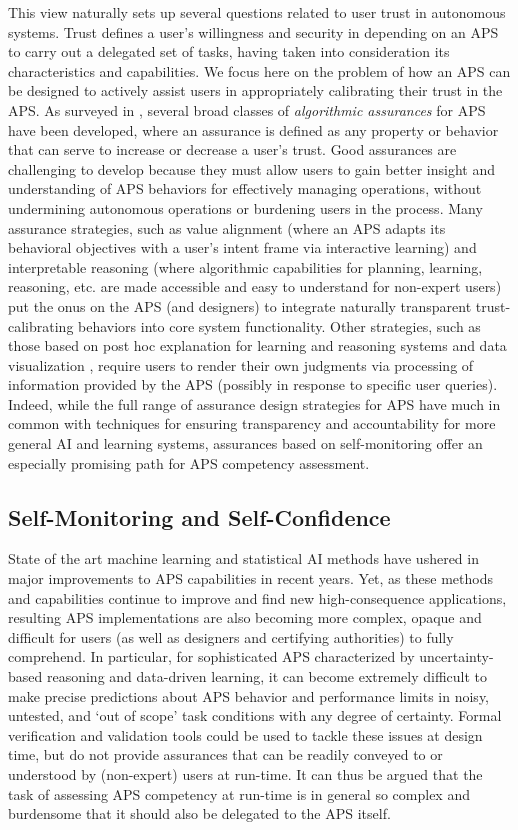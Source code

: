 This view naturally sets up several questions related to user trust in autonomous systems. Trust defines a user's willingness and security in depending on an APS to carry out a delegated set of tasks, having taken into consideration its characteristics and capabilities. 
We focus here on the problem of how an APS can be designed to actively assist users in appropriately calibrating their trust in the APS. As surveyed in \cite{Israelsen2017-ym}, several broad classes of \emph{algorithmic assurances} for APS have been developed, where an assurance is defined as any property or behavior that can serve to increase or decrease a user's trust. 
Good assurances are challenging to develop because they must allow users to gain better insight and understanding of APS behaviors for effectively managing operations, without undermining autonomous operations or burdening users in the process. 
Many assurance strategies, such as value alignment \cite{Dragan2014-gu} (where an APS adapts its behavioral objectives with a user's intent frame via interactive learning) and interpretable reasoning \cite{Ruping2006-xj} (where algorithmic capabilities for planning, learning, reasoning, etc. are made accessible and easy to understand for non-expert users) put the onus on the APS (and designers) to integrate naturally transparent trust-calibrating behaviors into core system functionality. 
Other strategies, such as those based on post hoc explanation for learning and reasoning systems \cite{Lacave2004-gq, Ribeiro2016-uc} and data visualization \cite{Sacha2017-hf}, require users to render their own judgments via processing of information provided by the APS (possibly in response to specific user queries). 
Indeed, while the full range of assurance design strategies for APS have much in common with techniques for ensuring transparency and accountability for more general AI and learning systems, assurances based on self-monitoring offer an especially promising path for APS competency assessment. 

\subsection{Self-Monitoring and Self-Confidence}
State of the art machine learning and statistical AI methods have ushered in major improvements to APS capabilities in recent years. 
Yet, as these methods and capabilities continue to improve and find new high-consequence applications, resulting APS implementations are also becoming more complex, opaque and difficult for users (as well as designers and certifying authorities) to fully comprehend. 
In particular, for sophisticated APS characterized by uncertainty-based reasoning and data-driven learning, it can become extremely difficult to make precise predictions about APS behavior and performance limits in noisy, untested, and `out of scope' task conditions with any degree of certainty. Formal verification and validation tools could be used to tackle these issues at design time, but do not provide assurances that can be readily conveyed to or understood by (non-expert) users at run-time. 
It can thus be argued that the task of assessing APS competency at run-time is in general so complex and burdensome that it should also be delegated to the APS itself. 

